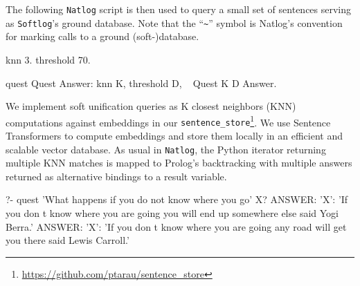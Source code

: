 \documentclass[submission,copyright,creativecommons]{eptcs}
\begin{document}
The following {\tt Natlog} script is then used to query a small set of sentences
serving as {\tt Softlog}'s ground database. Note that the ``\verb|~|'' symbol is Natlog's convention for marking calls to a ground (soft-)database.
\begin{code}
knn 3.
threshold 70.

quest  Quest Answer:
  knn K, %
  threshold D,
  ~ Quest K D Answer.
\end{code}
We implement soft unification queries  as K closest neighbors (KNN) computations against embeddings in our  {\tt sentence\_store}\footnote{\url{https://github.com/ptarau/sentence_store}}. We use Sentence Transformers \cite{sbert} to compute embeddings and store them locally in an efficient and scalable vector database.
As usual in {\tt Natlog}, the Python iterator returning multiple KNN matches is mapped to Prolog's backtracking with multiple answers returned as alternative bindings to a result variable.
 
\begin{codex}
?- quest 'What happens if you do not know where you go' X?
ANSWER: {'X': 'If you don t know where you are going 
               you will end up somewhere else said Yogi Berra.'}
ANSWER: {'X': 'If you don t know where you are going
               any road will get you there said Lewis Carroll.'}
\end{codex}
\end{document}

